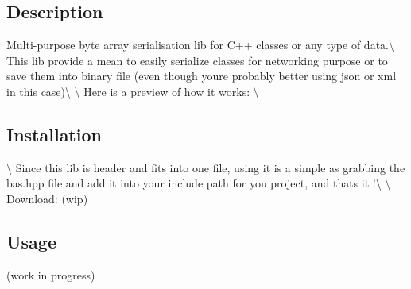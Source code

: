 \subsection*{Description}

Multi-\/purpose byte array serialisation lib for C++ classes or any type of data.\textbackslash{} This lib provide a mean to easily serialize classes for networking purpose or to save them into binary file (even though you\textquotesingle{}re probably better using json or xml in this case)\textbackslash{} \textbackslash{} Here is a preview of how it works\+:  \textbackslash{} \subsection*{Installation}

\textbackslash{} Since this lib is header and fits into one file, using it is a simple as grabbing the bas.\+hpp file and add it into your include path for you project, and that\textquotesingle{}s it !\textbackslash{} \textbackslash{} Download\+: (wip)

\subsection*{Usage}

(work in progress) 